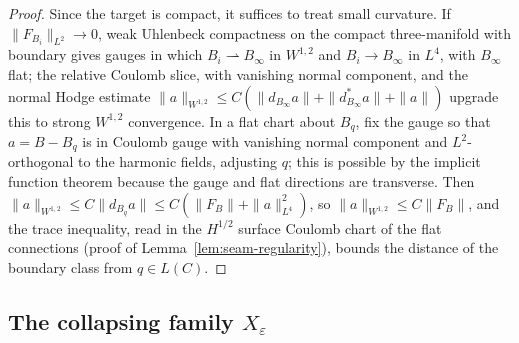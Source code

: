 \documentclass[11pt]{amsart}
\theoremstyle{definition}
\theoremstyle{remark}
\theoremstyle{plain}
\numberwithin{equation}{section}
\newcommand{\eps}{\varepsilon}
\begin{document}
\begin{proof}
Since the target is compact, it suffices to treat small curvature. If
$\|F_{B_i}\|_{L^2}\to0$, weak Uhlenbeck compactness on the compact
three-manifold with boundary \cite[Theorem~A]{Wehrheim-Uhlenbeck} gives gauges in which $B_i\rightharpoonup
B_\infty$ in $W^{1,2}$ and $B_i\to B_\infty$ in $L^4$, with $B_\infty$ flat;
the relative Coulomb slice, with vanishing normal component, and the
normal Hodge estimate
$\|a\|_{W^{1,2}}\le C(\|d_{B_\infty}a\|+\|d^*_{B_\infty}a\|+\|a\|)$ upgrade
this to strong $W^{1,2}$ convergence. In a flat chart about $B_q$, fix the
gauge so that $a=B-B_q$ is in Coulomb gauge with vanishing normal component
and $L^2$-orthogonal to the harmonic fields, adjusting $q$; this is possible
by the implicit function theorem because the gauge and flat directions are
transverse. Then $\|a\|_{W^{1,2}}\le C\|d_{B_q}a\|\le C(\|F_B\|+\|a\|_{L^4}^2)$,
so $\|a\|_{W^{1,2}}\le C\|F_B\|$, and the trace inequality, read in the
$H^{1/2}$ surface Coulomb chart of the flat connections (proof of
Lemma~\ref{lem:seam-regularity}), bounds the distance of the boundary class
from $q\in L(C)$.
\end{proof}

\subsection{The collapsing family $X_\eps$}\label{subsec:insertion}
\end{document}
